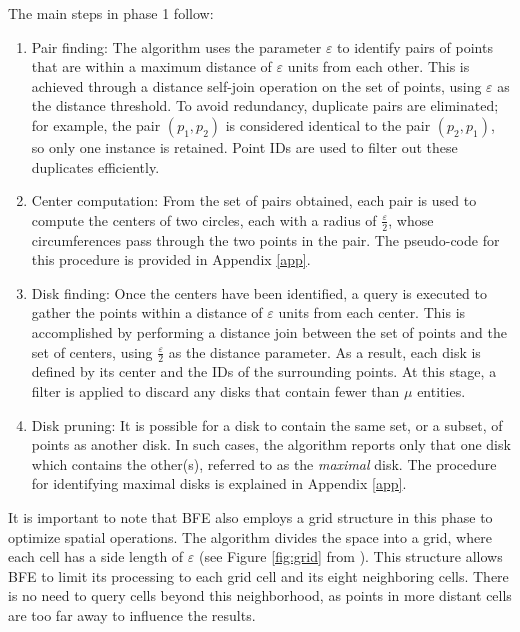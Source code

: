 The main steps in phase 1 follow:
\begin{enumerate}
    \item Pair finding:  The algorithm uses the parameter $\varepsilon$ to identify pairs of points that are within a maximum distance of $\varepsilon$ units from each other. This is achieved through a distance self-join operation on the set of points, using $\varepsilon$ as the distance threshold. To avoid redundancy, duplicate pairs are eliminated; for example, the pair $(p_1, p_2)$ is considered identical to the pair $(p_2, p_1)$, so only one instance is retained. Point IDs are used to filter out these duplicates efficiently.
    \item Center computation:  From the set of pairs obtained, each pair is used to compute the centers of two circles, each with a radius of $\frac{\varepsilon}{2}$, whose circumferences pass through the two points in the pair. The pseudo-code for this procedure is provided in Appendix \ref{app}.
    \item Disk finding: Once the centers have been identified, a query is executed to gather the points within a distance of $\varepsilon$ units from each center. This is accomplished by performing a distance join between the set of points and the set of centers, using $\frac{\varepsilon}{2}$ as the distance parameter. As a result, each disk is defined by its center and the IDs of the surrounding points. At this stage, a filter is applied to discard any disks that contain fewer than $\mu$ entities.
    \item Disk pruning: It is possible for a disk to contain the same set, or a subset, of points as another disk. In such cases, the algorithm reports only that one disk which contains the other(s), referred to as the \textit{maximal} disk. The procedure for identifying maximal disks is explained in Appendix \ref{app}.
\end{enumerate}

It is important to note that BFE also employs a grid structure in this phase to optimize spatial operations. The algorithm divides the space into a grid, where each cell has a side length of $\varepsilon$ (see Figure \ref{fig:grid} from \cite{vieira_2009}). This structure allows BFE to limit its processing to each grid cell and its eight neighboring cells. There is no need to query cells beyond this neighborhood, as points in more distant cells are too far away to influence the results.

